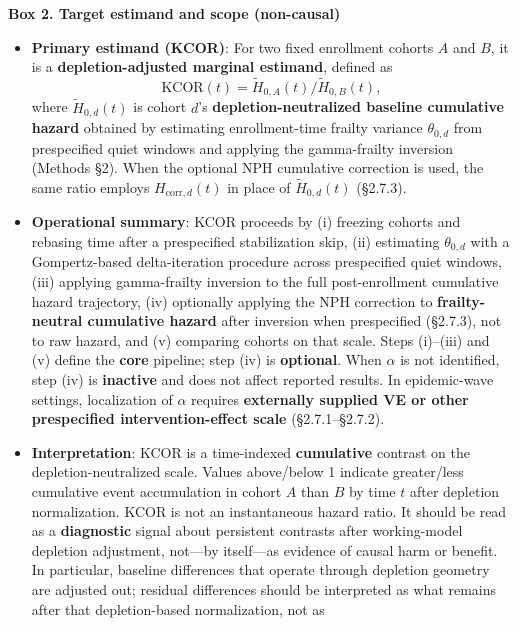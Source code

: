 \documentclass[
]{article}
\providecommand{\tightlist}{%
  \setlength{\itemsep}{0pt}\setlength{\parskip}{0pt}}
\renewenvironment{quote}{\begin{mdframed}[style=kcorquote]}{\end{mdframed}}
\begin{document}
\begin{quote}
\textbf{Box 2. Target estimand and scope (non-causal)}

\begin{itemize}
\tightlist
\item
  \textbf{Primary estimand (KCOR)}: For two fixed enrollment cohorts
  \(A\) and \(B\), it is a \textbf{depletion-adjusted marginal
  estimand}, defined as \[
  \mathrm{KCOR}(t)=\tilde H_{0,A}(t)/\tilde H_{0,B}(t),
  \] where \(\tilde H_{0,d}(t)\) is cohort \(d\)'s
  \textbf{depletion-neutralized baseline cumulative hazard} obtained by
  estimating enrollment-time frailty variance \(\theta_{0,d}\) from
  prespecified quiet windows and applying the gamma-frailty inversion
  (Methods §2). When the optional NPH cumulative correction is used, the
  same ratio employs \(H_{\mathrm{corr},d}(t)\) in place of
  \(\tilde H_{0,d}(t)\) (§2.7.3).
\item
  \textbf{Operational summary}: KCOR proceeds by (i) freezing cohorts
  and rebasing time after a prespecified stabilization skip, (ii)
  estimating \(\theta_{0,d}\) with a Gompertz-based delta-iteration
  procedure across prespecified quiet windows, (iii) applying
  gamma-frailty inversion to the full post-enrollment cumulative hazard
  trajectory, (iv) optionally applying the NPH correction to
  \textbf{frailty-neutral cumulative hazard} after inversion when
  prespecified (§2.7.3), not to raw hazard, and (v) comparing cohorts on
  that scale. Steps (i)--(iii) and (v) define the \textbf{core}
  pipeline; step (iv) is \textbf{optional}. When \(\alpha\) is not
  identified, step (iv) is \textbf{inactive} and does not affect
  reported results. In epidemic-wave settings, localization of
  \(\alpha\) requires \textbf{externally supplied VE or other
  prespecified intervention-effect scale} (§2.7.1--§2.7.2).
\item
  \textbf{Interpretation}: KCOR is a time-indexed \textbf{cumulative}
  contrast on the depletion-neutralized scale. Values above/below 1
  indicate greater/less cumulative event accumulation in cohort \(A\)
  than \(B\) by time \(t\) after depletion normalization. KCOR is not an
  instantaneous hazard ratio. It should be read as a \textbf{diagnostic}
  signal about persistent contrasts after working-model depletion
  adjustment, not---by itself---as evidence of causal harm or benefit.
  In particular, baseline differences that operate through depletion
  geometry are adjusted out; residual differences should be interpreted
  as what remains after that depletion-based normalization, not as

\end{itemize}
\end{quote}
\end{document}
